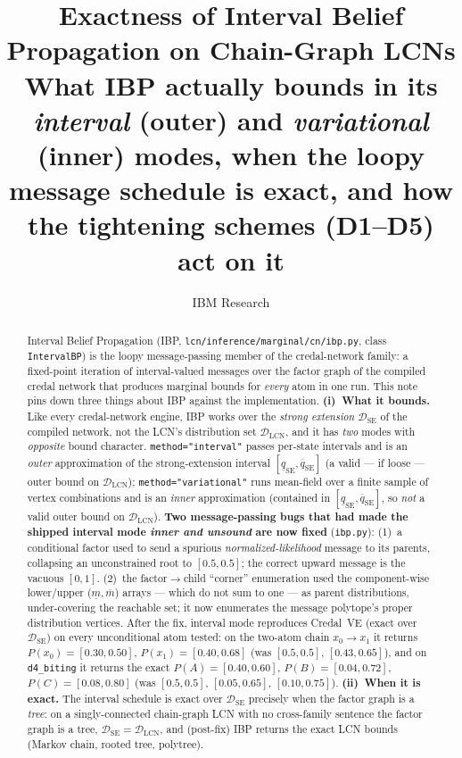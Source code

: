 \documentclass[11pt]{article}
\title{Exactness of Interval Belief Propagation on Chain-Graph LCNs\\
\large What IBP actually bounds in its \emph{interval} (outer) and
\emph{variational} (inner) modes, when the loopy message schedule is exact, and
how the tightening schemes (D1--D5) act on it}
\author{IBM Research}
\date{}
\newcommand{\lo}{\underline}
\newcommand{\hi}{\overline}
\newcommand{\DSE}{\mathcal{D}_{\mathrm{SE}}}
\newcommand{\DLCN}{\mathcal{D}_{\mathrm{LCN}}}
\begin{document}
\maketitle

\begin{abstract}
Interval Belief Propagation (IBP, \texttt{lcn/inference/marginal/cn/ibp.py}, class
\texttt{IntervalBP}) is the loopy message-passing member of the credal-network family: a
fixed-point iteration of interval-valued messages over the factor graph of the compiled credal
network that produces marginal bounds for \emph{every} atom in one run. This note pins down three
things about IBP against the implementation. \textbf{(i)~What it bounds.} Like every
credal-network engine, IBP works over the \emph{strong extension} $\DSE$ of the compiled network,
not the LCN's distribution set $\DLCN$, and it has \emph{two} modes with \emph{opposite} bound
character. \texttt{method="interval"} passes per-state intervals and is an \emph{outer} approximation
of the strong-extension interval $[\lo q_{\mathrm{SE}},\hi q_{\mathrm{SE}}]$ (a valid --- if loose ---
outer bound on $\DLCN$); \texttt{method="variational"} runs mean-field over a finite sample of vertex
combinations and is an \emph{inner} approximation (contained in $[\lo q_{\mathrm{SE}},\hi
q_{\mathrm{SE}}]$, so \emph{not} a valid outer bound on $\DLCN$). \textbf{Two message-passing bugs
that had made the shipped interval mode \emph{inner and unsound} are now fixed} (\texttt{ibp.py}):
(1)~a conditional factor used to send a spurious \emph{normalized-likelihood} message to its parents,
collapsing an unconstrained root to $[0.5,0.5]$; the correct upward message is the vacuous $[0,1]$.
(2)~the factor$\to$child ``corner'' enumeration used the component-wise lower/upper ($\lo{m},\hi{m}$) arrays --- which do
not sum to one --- as parent distributions, under-covering the reachable set; it now enumerates the
message polytope's proper distribution vertices. After the fix, interval mode reproduces Credal~VE
(exact over $\DSE$) on every unconditional atom tested: on the two-atom chain $x_0\!\to\!x_1$ it
returns $P(x_0){=}[0.30,0.50]$, $P(x_1){=}[0.40,0.68]$ (was $[0.5,0.5]$, $[0.43,0.65]$), and on
\texttt{d4\_biting} it returns the exact $P(A){=}[0.40,0.60]$, $P(B){=}[0.04,0.72]$,
$P(C){=}[0.08,0.80]$ (was $[0.5,0.5]$, $[0.05,0.65]$, $[0.10,0.75]$). \textbf{(ii)~When it is exact.}
The interval schedule is exact over $\DSE$ precisely when the factor graph is a \emph{tree}: on a
singly-connected chain-graph LCN with no cross-family sentence the factor graph is a tree,
$\DSE=\DLCN$, and (post-fix) IBP returns the exact LCN bounds (Markov chain, rooted tree, polytree).

\end{abstract}
\end{document}
